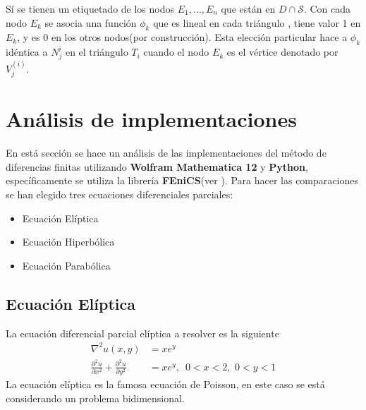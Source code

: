\documentclass[a4paper]{article}
\begin{document}
Sí se tienen un etiquetado de los nodos $E_1,\hdots,E_n$ que están en $D\cap \mathcal{S}$. Con cada nodo $E_k$ se asocia una función $\phi_k$ que es lineal en cada triángulo , tiene valor 1 en $E_k$, y es $0$ en los otros nodos(por construcción). Esta elección particular hace a $\phi_k$ idéntica a $N_j^{i}$ en el triángulo $T_i$ cuando el nodo $E_k$ es el vértice denotado por $V_j^{(i)}$.
\section{Análisis de implementaciones}
En está sección se hace un análisis de las implementaciones del método de diferencias finitas utilizando \textbf{Wolfram Mathematica 12} y \textbf{Python}, específicamente se utiliza la librería \textbf{FEniCS}(ver \cite{FEniCS}). Para hacer las comparaciones se han elegido tres ecuaciones diferenciales parciales:
\begin{itemize}
\item Ecuación Elíptica
\item Ecuación Hiperbólica
\item Ecuación Parabólica

\end{itemize}
\subsection{Ecuación Elíptica}
La ecuación diferencial parcial elíptica a resolver es la siguiente
\begin{equation}\label{eq::elliptic_pde}
\begin{aligned}
\nabla^2 u(x,y)&=x e^y\\
\frac{\partial ^2 u}{\partial x^2}+\frac{\partial ^2 u}{\partial y^2}&=x e^y, \,\,\, 0<x<2,\,\,0<y<1
\end{aligned}
\end{equation}
La ecuación elíptica es la famosa ecuación de Poisson, en este caso se está considerando un problema bidimensional.\\
\end{document}
